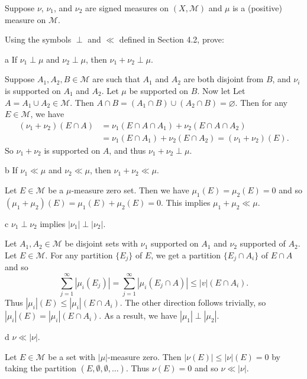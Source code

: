 \documentclass[11pt,letterpaper]{article}
\def\M{\mathcal{M}}
\begin{document}
\begin{problem}
    Suppose $\nu$, $\nu_1$, and $\nu_2$ are signed measures on $(X,\M)$ and $\mu$ is a (positive) measure on $\M$.
\end{problem}

\begin{solution}
    Using the symbols $\perp$ and $\ll$ defined in Section 4.2, prove:
    \begin{partproblem}{a} If $\nu_1 \perp \mu$ and $\nu_2 \perp \mu$, then $\nu_1+\nu_2 \perp \mu$. \end{partproblem}
    \quad Suppose $A_1,A_2,B \in \M$ are such that $A_1$ and $A_2$ are both disjoint from $B$, and $\nu_i$ is supported on $A_1$ and $A_2$. Let $\mu$ be supported on $B$. Now let Let $A = A_1 \cup A_2 \in \M$. Then $A \cap B = (A_1 \cap B) \cup (A_2 \cap B) = \varnothing$. Then for any $E \in \M$, we have
    \begin{align*}
    (\nu_1+\nu_2)(E\cap A) &= \nu_1(E \cap A \cap A_1)+\nu_2(E \cap A \cap A_2) \\
    &= \nu_1(E \cap A_1)+\nu_2(E \cap A_2) = (\nu_1+\nu_2)(E).
    \end{align*}
    So $\nu_1+\nu_2$ is supported on $A$, and thus $\nu_1+\nu_2 \perp \mu$.
    
\begin{partproblem}{b} If $\nu_1 \ll \mu$ and $\nu_2 \ll \mu$, then $\nu_1+\nu_2 \ll \mu$. \end{partproblem}
    \quad Let $E\in \M$ be a $\mu$-measure zero set. Then we have $\mu_1(E)=\mu_2(E)=0$ and so $(\mu_1+\mu_2)(E)=\mu_1(E)+\mu_2(E)=0$. This implies $\mu_1+\mu_2\ll \mu$.

\begin{partproblem}{c} $\nu_1 \perp \nu_2$ implies $|\nu_1|\perp |\nu_2|$. \end{partproblem}
    \quad Let $A_1,A_2\in \M$ be disjoint sets with $\nu_1$ supported on $A_1$ and $\nu_2$ supported of $A_2$. Let $E\in \M$. For any partition $\{E_j\}$ of $E$, we get a partition $\{E_j\cap A_i\}$ of $E\cap A$ and so
    \[
        \sum^\infty_{j=1}|\mu_i(E_j)| = \sum^\infty_{j=1}|\mu_i(E_j\cap A)|\leq |v|(E\cap A_i)
    .\]  
    Thus $|\mu_i|(E)\leq |\mu_i|(E\cap A_i)$. The other direction follows trivially, so $|\mu_i|(E)=|\mu_i|(E\cap A_i)$. As a result, we have $|\mu_1|\perp |\mu_2|$.

\begin{partproblem}{d} $\nu \ll |\nu|$. \end{partproblem}
    \begin{solution}
    Let $E \in \M$ be a set with $|\mu|$-measure zero. Then $|\nu(E)| \leq |\nu|(E)=0$ by taking the partition $(E,\emptyset, \emptyset, \ldots)$. Thus $\nu(E)=0$ and so $\nu \ll |\nu|$.
    \end{solution}
    

\end{solution}
\end{document}
